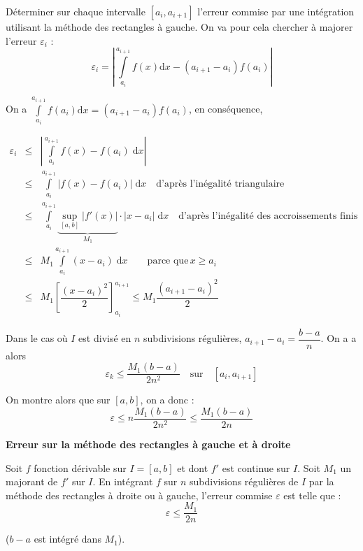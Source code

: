 \documentclass[10pt]{article}
\begin{document}
\begin{Objectif}
Déterminer sur chaque intervalle $[a_i,a_{i+1}]$ l'erreur commise par une intégration utilisant la méthode des rectangles à gauche. On va pour cela chercher à majorer l'erreur $\varepsilon_i$ :
$$
\varepsilon_i = \left| \int\limits_{a_i}^{a_{i+1}}f(x)\mathrm{d}x -\left(a_{i+1}-a_{i}\right) f(a_i)\right|
$$
\end{Objectif}

On a $\int\limits_{a_i}^{a_{i+1}}f(a_i)\mathrm{d}x=\left(a_{i+1}-a_{i}\right) f(a_i)$, en conséquence, 

\allowdisplaybreaks

\begin{eqnarray*}
\varepsilon_i &\leq &  \left| \int\limits_{a_i}^{a_{i+1}}f(x) -  f(a_i) \; \mathrm{d}x\right|  \\
&\leq &   \int\limits_{a_i}^{a_{i+1}} \left| f(x) -  f(a_i) \right|\; \mathrm{d}x \quad \text{d'après l'inégalité triangulaire}\\
&\leq &   \int\limits_{a_i}^{a_{i+1}} \underbrace{\underset{[a,b]}{\sup} \left| f'(x)\right|}_{M_1} \cdot \left| x-a_i\right|  \; \mathrm{d}x \quad \text{d'après l'inégalité des accroissements finis}\\
& \leq & M_1 \int\limits_{a_i}^{a_{i+1}}  \left( x-a_i\right)  \; \mathrm{d}x \quad  \quad \text{parce que}\, x\geq a_i\\
& \leq & M_1   \left[ \dfrac{\left(x-a_i\right)^2}{2}\right]_{a_i}^{a_{i+1}} \leq M_1 \dfrac{\left(a_{i+1}-a_i\right)^2}{2}
\end{eqnarray*}

Dans le cas où $I$ est divisé en $n$ subdivisions régulières, $a_{i+1}-a_i = \dfrac{b-a}{n}$. On a a alors 
$$
\varepsilon_k \leq \dfrac{M_1(b-a)}{2n^2} \quad \text{sur}\quad [a_i,a_{i+1}]
$$

On montre alors que sur $[a,b]$, on a donc :
$$
\varepsilon \leq n\dfrac{M_1(b-a)}{2n^2} \leq \dfrac{M_1(b-a)}{2n} 
$$


\begin{resultat}
\textbf{Erreur sur la méthode des rectangles à gauche et à droite}

Soit $f$ fonction dérivable sur $I=[a,b]$ et dont $f'$ est continue sur $I$. Soit $M_1$ un majorant de $f'$ sur $I$. En intégrant $f$ sur $n$ subdivisions régulières de $I$ par la méthode des rectangles à droite ou à gauche, l'erreur commise $\varepsilon$ est telle que : 
$$ \varepsilon \leq \dfrac{M_1}{2n}$$ 

($b-a$ est intégré dans $M_1$).
\end{resultat}
\end{document}
